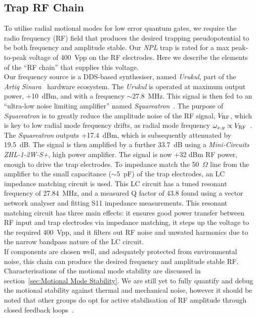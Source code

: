 \subsection{Trap RF Chain}
\label{sec:Trap RF Chain}
    To utilise radial motional modes for low error quantum gates, we require the
    radio frequency (RF) field that produces the desired trapping
    pseudopotential to be both frequency and amplitude stable. Our \emph{NPL}
    trap is rated for a max peak-to-peak voltage of 400~Vpp on the RF
    electrodes. Here we describe the elements of the ``RF chain'' that supplies
    this voltage. \\
    Our frequency source is a DDS-based synthesiser, named \emph{Urukul}, part
    of the \emph{Artiq Sinara}~\cite{} hardware ecosystem. The
    \emph{Urukul} is operated at maximum output power, +10~dBm, and with a frequency $\sim 27.8$~MHz. This
    signal is then fed to an ``ultra-low noise limiting amplifier'' named
    \emph{Squareatron}~\cite{}. The purpose of \emph{Squareatron} is to
    greatly reduce the amplitude noise of the RF signal, $V_{\rm RF}$, which is
    key to low radial mode frequency drifts, as radial mode frequency $\omega_{x,y} \propto V_{\rm RF}$~\cite{}. The \emph{Squareatron} outputs +17.4~dBm,
    which is subsequently attenuated by 19.5~dB. The signal is then amplified by a
    further 33.7~dB using a \emph{Mini-Circuits ZHL-1-2W-S+}, high power
    amplifier. The signal is now +32 dBm RF power, enough to drive the trap
    electrodes. To impedance match the 50~$\Omega$ line from the amplifier to
    the small capacitance ($\sim 5$~pF) of the trap electrodes, an LC
    impedance matching circuit is used. This LC circuit has a tuned resonant frequency of 27.84~MHz, and a
    measured Q factor of 43.8 found using a vector network analyser and fitting S11 impedance measurements.
    This resonant matching circuit has three main effects: it ensures good power transfer
    between RF input and trap electrodes via impedance matching, it steps up the
    voltage to the required 400~Vpp, and it filters out RF noise and unwated harmonics due to
    the narrow bandpass nature of the LC circuit. \\
    If components are chosen well, and adequately protected from
    environmental noise, this chain can produce the desired frequency and
    amplitude stable RF. Characterisations of the motional mode
    stability are discussed in section~\ref{sec:Motional Mode Stability}. We are
    still yet to fully quantify and debug the motional stability against thermal
    and mechanical noise, however it should be noted that other groups do opt
    for active stabilisation of RF amplitude through closed feedback loops~\cite{}.\\

